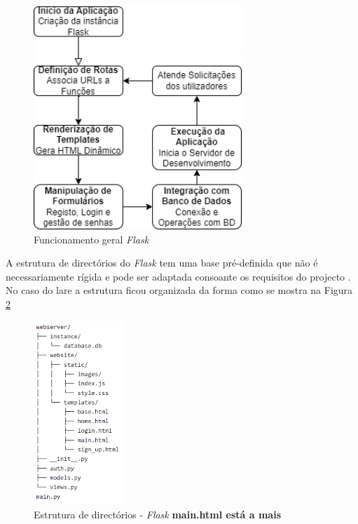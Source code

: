 \begin{figure}[hbtp]
	\centering
	\includegraphics[width=0.7\textwidth]{figures/fluxograma_flask.drawio.png}
	\caption{Funcionamento geral \textit{Flask}}
	\label{fig:funcflask}
\end{figure}

A estrutura de directórios do \textit{Flask} tem uma base pré-definida que não é necessariamente rígida e pode ser adaptada consoante os requisitos do projecto \cite{Flask}. No caso do \acrshort{lare} a estrutura ficou organizada da forma como se mostra na Figura \ref{fig:estruturapastas}

\begin{figure}[hbtp]
	\centering
	\includegraphics[width=0.3\textwidth]{figures/tree_flask.png}
	\caption{Estrutura de directórios - \textit{Flask} \textbf{ main.html está a mais}}
	\label{fig:estruturapastas}
\end{figure}

